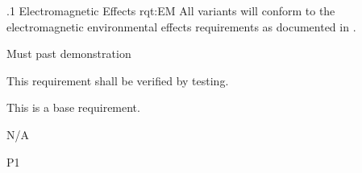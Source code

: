 

\ONERQMTVKSA
{\RqtNumberBase.1}
{Electromagnetic Effects}
{rqt:EM}
{All \ThisSystem variants will conform to the electromagnetic environmental effects requirements as documented in \TBD.}
{
	\item [Phase 1] Must past demonstration
}
{This requirement shall be verified by testing.}
{
\item [N/A] This is a base requirement.
}
{
	\item N/A
}
{P1}
